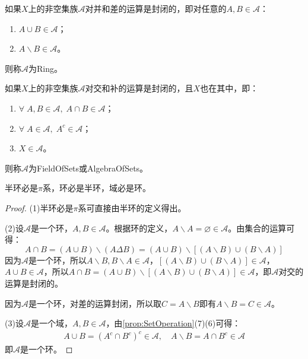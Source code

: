 \begin{definition}
	如果$X$上的非空集族$\mathscr{A}$对并和差的运算是封闭的，即对任意的$A,B\in\mathscr{A}$：
	\begin{enumerate}
		\item $A\cup B\in\mathscr{A}$；
		\item $A\backslash B\in\mathscr{A}$。
	\end{enumerate}
	则称$\mathscr{A}$为\gls{Ring}。
\end{definition}
\begin{definition}
	如果$X$上的非空集族$\mathscr{A}$对交和补的运算是封闭的，且$X$也在其中，即：
	\begin{enumerate}
		\item $\forall\;A,B\in\mathscr{A},\;A\cap B\in\mathscr{A}$；
		\item $\forall\;A\in\mathscr{A},\;A^c\in\mathscr{A}$；
		\item $X\in\mathscr{A}$。
	\end{enumerate}
	则称$\mathscr{A}$为\gls{FieldOfSets}或\gls{AlgebraOfSets}。
\end{definition}
\begin{theorem}\label{theo:SetNecessarilySet1}
	半环必是$\pi$系，环必是半环，域必是环。
\end{theorem}
\begin{proof}
	(1)半环必是$\pi$系可直接由半环的定义得出。\par
	(2)设$\mathscr{A}$是一个环，$A,B\in\mathscr{A}$。根据环的定义，$A\backslash A=\varnothing\in\mathscr{A}$。由集合的运算可得：
	\begin{equation*}
		A\cap B=(A\cup B)\backslash(A\Delta B)=(A\cup B)\backslash[(A\backslash B)\cup(B\backslash A)] 
	\end{equation*}
	因为$\mathscr{A}$是一个环，所以$A\backslash B,B\backslash A\in\mathscr{A}$，$[(A\backslash B)\cup(B\backslash A)]\in\mathscr{A}$，$A\cup B\in\mathscr{A}$，所以$A\cap B=(A\cup B)\backslash[(A\backslash B)\cup(B\backslash A)]\in\mathscr{A}$，即$\mathscr{A}$对交的运算是封闭的。\par
	因为$\mathscr{A}$是一个环，对差的运算封闭，所以取$C=A\backslash B$即有$A\backslash B=C\in\mathscr{A}$。\par
	(3)设$\mathscr{A}$是一个域，$A,B\in\mathscr{A}$，由\cref{prop:SetOperation}(7)(6)可得：
	\begin{gather*}
		A\cup B=(A^c\cap B^c)^c\in\mathscr{A},\quad A\backslash B=A\cap B^c\in\mathscr{A}
	\end{gather*}
	即$\mathscr{A}$是一个环。
\end{proof}
